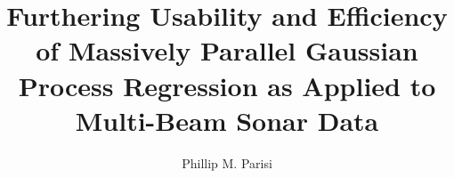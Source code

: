 \documentclass[manuscript,masters,oneref,electronic]{urithesis}
\begin{document}
\title{Furthering Usability and Efficiency of Massively Parallel Gaussian Process Regression as Applied to Multi-Beam Sonar Data}
\author{Phillip M. Parisi}

%

\end{document}
